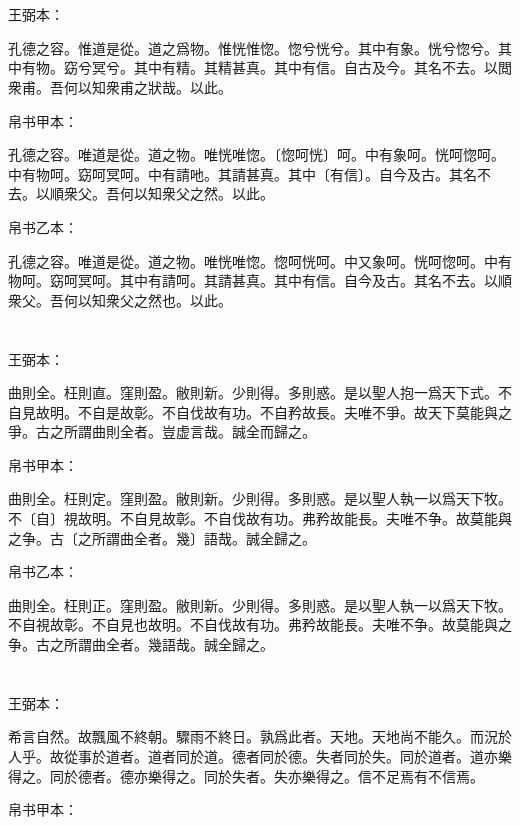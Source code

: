 \documentclass[a5paper]{ctexbook}
\begin{document}
    \chapter{}
    王弼本：

    孔德之容。惟道是從。道之爲物。惟恍惟惚。惚兮恍兮。其中有象。恍兮惚兮。其中有物。窈兮冥兮。其中有精。其精甚真。其中有信。自古及今。其名不去。以閲衆甫。吾何以知衆甫之狀哉。以此。

    
    帛书甲本：

    孔德之容。唯道是從。道之物。唯恍唯惚。〔惚呵恍〕呵。中有象呵。恍呵惚呵。中有物呵。窈呵冥呵。中有請吔。其請甚真。其中〔有信〕。自今及古。其名不去。以順衆父。吾何以知衆父之然。以此。

    帛书乙本：

    孔德之容。唯道是從。道之物。唯恍唯惚。惚呵恍呵。中又象呵。恍呵惚呵。中有物呵。窈呵冥呵。其中有請呵。其請甚真。其中有信。自今及古。其名不去。以順衆父。吾何以知衆父之然也。以此。

    \chapter{}
    王弼本：

    曲則全。枉則直。窪則盈。敝則新。少則得。多則惑。是以聖人抱一爲天下式。不自見故明。不自是故彰。不自伐故有功。不自矜故長。夫唯不爭。故天下莫能與之爭。古之所謂曲則全者。豈虚言哉。誠全而歸之。

    
    帛书甲本：

    曲則全。枉則定。窪則盈。敝則新。少則得。多則惑。是以聖人執一以爲天下牧。不〔自〕視故明。不自見故彰。不自伐故有功。弗矜故能長。夫唯不争。故莫能與之争。古〔之所謂曲全者。幾〕語哉。誠全歸之。

    帛书乙本：

    曲則全。枉則正。窪則盈。敝則新。少則得。多則惑。是以聖人執一以爲天下牧。不自視故彰。不自見也故明。不自伐故有功。弗矜故能長。夫唯不争。故莫能與之争。古之所謂曲全者。幾語哉。誠全歸之。

    \chapter{}
    王弼本：

    希言自然。故飄風不終朝。驟雨不終日。孰爲此者。天地。天地尚不能久。而況於人乎。故從事於道者。道者同於道。德者同於德。失者同於失。同於道者。道亦樂得之。同於德者。德亦樂得之。同於失者。失亦樂得之。信不足焉有不信焉。

    
    帛书甲本：
\end{document}
